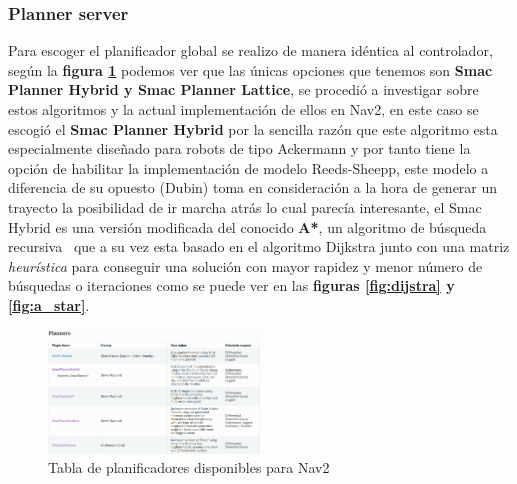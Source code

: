 \subsubsection{Planner server} 
Para escoger el planificador global se realizo de manera idéntica al controlador, según la \textbf{figura \ref{fig:planificadores_tabla}} podemos ver que las únicas opciones que tenemos son 
\textbf{Smac Planner Hybrid y Smac Planner Lattice}, se procedió a investigar sobre estos algoritmos y la actual implementación de ellos en Nav2, en este caso se escogió 
el \textbf{Smac Planner Hybrid} por la sencilla razón que este algoritmo esta especialmente diseñado para robots de tipo Ackermann y por tanto tiene la opción de habilitar 
la implementación de modelo Reeds-Sheepp, este modelo a diferencia de su opuesto (Dubin) toma en consideración a la hora de generar 
un trayecto la posibilidad de ir marcha atrás lo cual parecía interesante, el Smac Hybrid es una versión modificada 
del conocido \textbf{A*}, un algoritmo de búsqueda recursiva~\cite{dolgov2008practical} que a su vez esta basado en el algoritmo Dijkstra junto con una matriz 
\textit{heurística} para conseguir una solución con mayor rapidez y menor número de búsquedas o iteraciones como se puede ver en las 
\textbf{figuras \ref{fig:dijstra} y \ref{fig:a_star}}. 
\begin{figure}[H]
    \centering
    \includegraphics[width=0.5\textwidth]{images/planificadores_table.png}
    \caption{Tabla de planificadores disponibles para Nav2}
    \label{fig:planificadores_tabla}
\end{figure}


